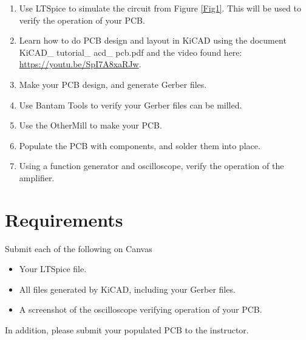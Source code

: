 \documentclass[12pt,letterpaper,onecolumn]{report}
\begin{document}
\begin{enumerate}
\item Use LTSpice to simulate the circuit from Figure \ref{Fig1}.  This will be used to verify the operation of your PCB.
\item Learn how to do PCB design and layout in KiCAD using the document KiCAD\_ tutorial\_ acd\_ pcb.pdf and the video found here: \url{https://youtu.be/SpI7A8xaRJw}.
\item Make your PCB design, and generate Gerber files.
\item Use Bantam Tools to verify your Gerber files can be milled.
\item Use the OtherMill to make your PCB.
\item Populate the PCB with components, and solder them into place.
\item Using a function generator and oscilloscope, verify the operation of the amplifier.
\end{enumerate}

\section*{Requirements}
\noindent Submit each of the following on Canvas
\begin{itemize}
\item Your LTSpice file.
\item All files generated by KiCAD, including your Gerber files.
\item A screenshot of the oscilloscope verifying operation of your PCB.
\end{itemize}
\noindent In addition, please submit your populated PCB to the instructor.
\end{document}

